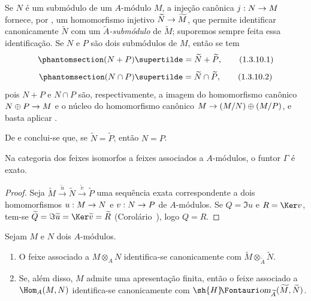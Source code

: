 \documentclass[oneside]{amsart}
\makeatletter
\newcommand{\ega@arrow}[2]{\mathchoice{#1}{#2}{#2}{#2}}
\renewcommand{\to}{\ega@arrow{\longrightarrow}{\rightarrow}}
\newcommand*{\ega@sheafop}[3]{\sh{#1}#2\textup{\kern-2.2pt{\Fontauri\slshape #3}}}
\newcommand*{\shHom}{\ega@sheafop{H}{}{om}}
\let\EGAOriginalLabel\label
\renewcommand{\label}[1]{\phantomsection\EGAOriginalLabel{#1}}
\makeatother
\begin{document}
\begin{env}[1.3.10]
\label{I.1.3.10}
Se $N$ é um submódulo de um $A$-módulo $M$, a injeção canônica $j:N\to M$ fornece, por , um homomorfismo injetivo $\widetilde{N}\to\widetilde{M}$, que permite identificar canonicamente $\widetilde{N}$ com um \emph{$\widetilde{A}$-submódulo} de $\widetilde{M}$;
suporemos sempre feita essa identificação.
Se $N$ e $P$ são dois submódulos de $M$, então se tem
\[
\label{I.1.3.10.1}
  (N+P)\supertilde=\widetilde{N}+\widetilde{P},
  \tag{1.3.10.1}
\]
\[
\label{I.1.3.10.2}
  (N\cap P)\supertilde=\widetilde{N}\cap\widetilde{P},
  \tag{1.3.10.2}
\]
pois $N+P$ e $N\cap P$ são, respectivamente, a imagem do homomorfismo canônico
$N\oplus P\to M$ e o núcleo do homomorfismo canônico $M\to(M/N)\oplus(M/P)$, e basta aplicar .

De  e  conclui-se que, se $\widetilde{N}=\widetilde{P}$, então $N=P$.
\end{env}

\begin{corollary}[1.3.11]
\label{I.1.3.11}
Na categoria dos feixes isomorfos a feixes associados a $A$-módulos, o funtor $\Gamma$ é exato.
\end{corollary}

\begin{proof}
Seja $\widetilde{M}\xrightarrow{\widetilde{u}}\widetilde{N}\xrightarrow{\widetilde{v}}\widetilde{P}$ uma sequência exata correspondente a dois homomorfismos $u:M\to N$ e $v:N\to P$ de $A$-módulos.
Se $Q=\Im u$ e $R=\Ker v$, tem-se $\widetilde{Q}=\Im\widetilde{u}=\Ker\widetilde{v}=\widetilde{R}$ (Corolário~), logo $Q=R$.
\end{proof}

\begin{corollary}[1.3.12]
\label{I.1.3.12}
Sejam $M$ e $N$ dois $A$-módulos.
\begin{enumerate}
  \item[{\rm(i)}] O feixe associado a $M\otimes_A N$ identifica-se canonicamente com $\widetilde{M}\otimes_{\widetilde{A}}\widetilde{N}$.
  \item[{\rm(ii)}] Se, além disso, $M$ admite uma apresentação finita, então o feixe associado a $\Hom_A(M,N)$ identifica-se canonicamente com $\shHom_{\widetilde{A}}(\widetilde{M},\widetilde{N})$.
\end{enumerate}
\end{corollary}
\end{document}
